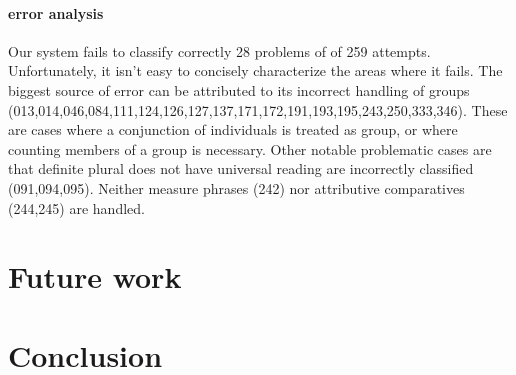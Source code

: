 \documentclass{article}
\begin{document}
\paragraph{error analysis}
Our system fails to classify correctly 28 problems of of 259 attempts.
Unfortunately, it isn't easy to concisely characterize the areas where
it fails.  The biggest source of error can be attributed to its
incorrect handling of groups
(013,014,046,084,111,124,126,127,137,171,172,191,193,195,243,250,333,346). These
are cases where a conjunction of individuals is treated as group, or
where counting members of a group is necessary.  Other notable
problematic cases are that definite plural does not have universal
reading are incorrectly classified (091,094,095). Neither measure
phrases (242) nor attributive comparatives (244,245) are handled.


\section{Future work}
\section{Conclusion}


\printbibliography
\end{document}
